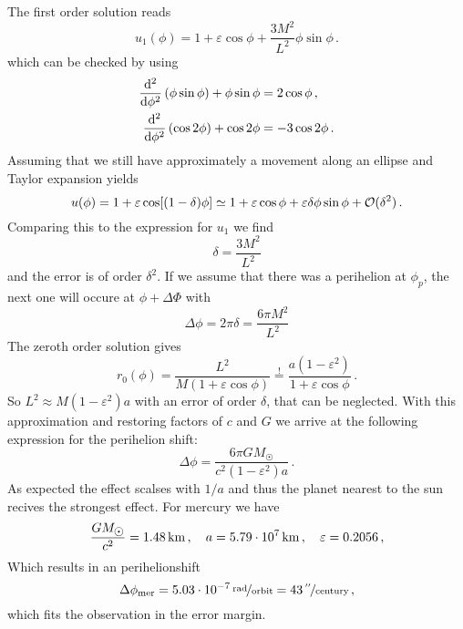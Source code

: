 The first order solution reads
\begin{equation}
u_1(\phi)=1+\varepsilon\cos\phi+\frac{3M^2}{L^2}\phi\sin\phi\,.
\end{equation}
which can be checked by using
\begin{align}
\dod[2]{}{\phi}(\phi\sin\phi)+\phi\sin\phi&=2\cos\phi\,,\\
\dod[2]{}{\phi}(\cos 2\phi)+\cos 2\phi&=-3\cos 2\phi\,.
\end{align}
Assuming that we still have approximately a movement along an ellipse and Taylor
expansion yields
\begin{equation}
u(\phi)=1+\varepsilon\cos[(1-\delta)\phi]
\simeq
1+\varepsilon\cos\phi
+\varepsilon\delta\phi\sin\phi+\mathcal{O}(\delta^2)\,.
\end{equation}
Comparing this to the expression for $u_1$ we find
\begin{equation}
\delta=\frac{3M^2}{L^2}
\end{equation}
and the error is of order $\delta^2$.
If we assume that there was a perihelion at $\phi_p$, the next one will occure
at $\phi+\Delta\Phi$ with 
\begin{equation}
\Delta\phi=2\pi\delta=\frac{6\pi M^2}{L^2}
\end{equation}
The zeroth order solution gives 
\begin{equation}
r_0(\phi)=\frac{L^2}{M(1+\varepsilon\cos\phi)}\stackrel{!}{=}
\frac{a(1-\varepsilon^2)}{1+\varepsilon\cos\phi}\,.
\end{equation}
So $L^2\approx M(1-\varepsilon^2)a$ with an error of order $\delta$, that can
be neglected.
With this approximation and restoring factors of $c$ and $G$ we arrive at the following
expression for the perihelion shift:
\begin{equation}
\Delta\phi=\frac{6\pi G M_{\astrosun}}{c^2 (1-\varepsilon^2)a}\,.
\end{equation}
As expected the effect scalses with $1/a$ and thus the planet nearest to the sun
recives the strongest effect. For mercury we have
\begin{equation}
\frac{GM_{\astrosun}}{c^2}=\unit[1.48]{km}\,,\quad a =\unit[5.79\cdot
10^7]{km}\,,\quad\varepsilon=0.2056\,,
\end{equation}
Which results in an perihelionshift
\begin{equation}
\Delta\phi\textsubscript{mer}
=\unitfrac[5.03\cdot 10^{-7}]{rad}{orbit}
=\unitfrac[43]{{}^{\prime\prime}}{century}\,,
\end{equation}
which fits the observation in the error margin.